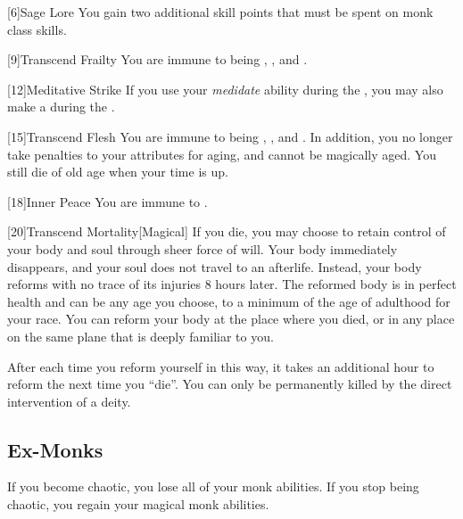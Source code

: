         [6]{Sage Lore} You gain two additional skill points that must be spent on monk class skills.

        [9]{Transcend Frailty}
        You are immune to being , , and .

        [12]{Meditative Strike} If you use your \textit{medidate} ability during the , you may also make a  during the .

        [15]{Transcend Flesh}
        You are immune to being , , and .
        In addition, you no longer take penalties to your attributes for aging, and cannot be magically aged.
        You still die of old age when your time is up.

        [18]{Inner Peace}
        You are immune to  .

        [20]{Transcend Mortality}[Magical]
        If you die, you may choose to retain control of your body and soul through sheer force of will.
        Your body immediately disappears, and your soul does not travel to an afterlife.
        Instead, your body reforms with no trace of its injuries 8 hours later.
        The reformed body is in perfect health and can be any age you choose, to a minimum of the age of adulthood for your race.
        You can reform your body at the place where you died, or in any place on the same plane that is deeply familiar to you.

        After each time you reform yourself in this way, it takes an additional hour to reform the next time you ``die''.
        You can only be permanently killed by the direct intervention of a deity.

    \subsection{Ex-Monks}
        If you become chaotic, you lose all of your  monk abilities.
        If you stop being chaotic, you regain your magical monk abilities.

